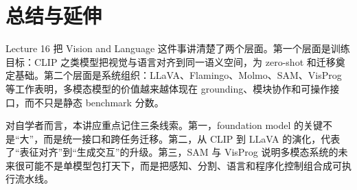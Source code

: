 \documentclass[a4paper]{article}
\begin{document}
    \section{总结与延伸}

    Lecture 16 把 Vision and Language 这件事讲清楚了两个层面。第一个层面是训练目标：CLIP 之类模型把视觉与语言对齐到同一语义空间，为 zero-shot 和迁移奠定基础。第二个层面是系统组织：LLaVA、Flamingo、Molmo、SAM、VisProg 等工作表明，多模态模型的价值越来越体现在 grounding、模块协作和可操作接口，而不只是静态 benchmark 分数。

    对自学者而言，本讲应重点记住三条线索。第一，foundation model 的关键不是“大”，而是统一接口和跨任务迁移。第二，从 CLIP 到 LLaVA 的演化，代表了“表征对齐”到“生成交互”的升级。第三，SAM 与 VisProg 说明多模态系统的未来很可能不是单模型包打天下，而是把感知、分割、语言和程序化控制组合成可执行流水线。
\end{document}

